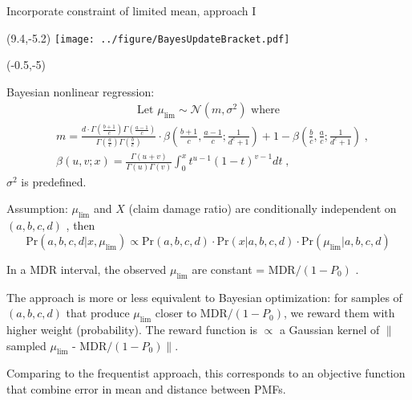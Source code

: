 \documentclass[aspectratio=169]{beamer}
\begin{document}
\begin{frame}{Incorporate constraint of limited mean, approach I}
\begin{textblock}{1}(9.4,-5.2)
\texttt{[image: ../figure/BayesUpdateBracket.pdf]}
\end{textblock}
\begin{textblock}{9}(-0.5,-5)

\tiny Bayesian nonlinear regression:
\tiny \begin{equation*}
\begin{split}
\text{Let }\mu_{\text{lim}}\sim\mathcal{N}(m, \sigma ^ 2) \text{ where}
\end{split}
\end{equation*}
\tiny \begin{equation*}
\begin{split}
&m = \frac{ d \cdot  \Gamma\left(  \frac{b + 1}{c}  \right)\Gamma\left(   \frac{a-1}{c} \right)  }{\Gamma\left(    \frac{a}{c}  \right) \Gamma\left( \frac{b}{c} \right) }\cdot \beta \left( \frac{b+1}{c}  ,  \frac{a-1}{c} ;   \frac{1}{d^c+1}  \right) +1 - \beta \left( \frac{b}{c} , \frac{a}{c} ; \frac{1}{d^c+1} \right)\;,\\
&\beta(u, v; x) =  \frac{\Gamma(u + v)}{ \Gamma(u)\Gamma(v) }\int_{0}^{x} t^{u-1}(1-t)^{v-1}dt\;,
\end{split}
\end{equation*}
$\sigma^2$ is predefined.\medskip\medskip%

\tiny Assumption: $\mu_{\text{lim}}$ and $X$ (claim damage ratio) are conditionally independent on $(a, b, c, d)$ , then
\tiny \begin{equation*}
\text{Pr}(a, b, c, d|x, \mu_{\text{lim}}) \propto \text{Pr}(a, b, c, d)  \cdot \text{Pr}(x|a, b, c, d) \cdot \text{Pr}(\mu_{\text{lim}}|a, b, c, d)    
\end{equation*}

\tiny In a MDR interval, the observed $\mu_{\text{lim}}$ are constant =  MDR$/(1 - P_0)$ .\medskip%

\tiny The approach is more or less equivalent to Bayesian optimization: for samples of $(a,b,c,d)$ that produce $\mu_{\text{lim}}$ closer to MDR$/(1 - P_0)$, we reward them with higher weight (probability). The reward function is $\propto$ a Gaussian kernel of $\|$sampled $\mu_{\text{lim}}$ - MDR$/(1 - P_0)\|$.\medskip%

\tiny Comparing to the frequentist approach, this corresponds to an objective function that combine error in mean and distance between PMFs. 
\end{textblock}

\end{frame}
\end{document}
